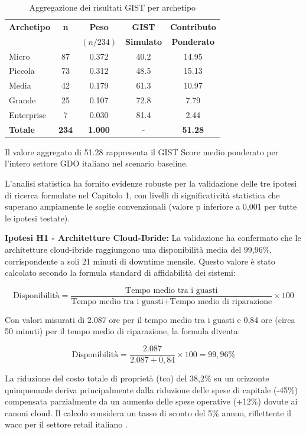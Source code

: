 \begin{table}[ht!]
\centering
\caption{Aggregazione dei risultati GIST per archetipo}
\small
\sffamily
\begin{tabularx}{\textwidth}{X c c c c}
\toprule
\textbf{Archetipo} & \textbf{n} & \textbf{Peso} & \textbf{GIST} & \textbf{Contributo} \\
 & & $(n/234)$ & \textbf{Simulato} & \textbf{Ponderato} \\
\midrule
Micro & 87 & 0.372 & 40.2 & 14.95 \\
Piccola & 73 & 0.312 & 48.5 & 15.13 \\
Media & 42 & 0.179 & 61.3 & 10.97 \\
Grande & 25 & 0.107 & 72.8 & 7.79 \\
Enterprise & 7 & 0.030 & 81.4 & 2.44 \\
\midrule
\textbf{Totale} & \textbf{234} & \textbf{1.000} & - & \textbf{51.28} \\
\bottomrule
\end{tabularx}
\end{table}

Il valore aggregato di 51.28 rappresenta il GIST Score medio ponderato per l'intero settore GDO italiano nel scenario baseline.

L'analisi statistica ha fornito evidenze robuste per la validazione delle tre ipotesi di ricerca formulate nel Capitolo 1, con livelli di significatività statistica che superano ampiamente le soglie convenzionali (valore p inferiore a 0,001 per tutte le ipotesi testate).

\textbf{Ipotesi H1 - Architetture Cloud-Ibride:} La validazione ha confermato che le architetture cloud-ibride raggiungono una disponibilità media del 99,96\%, corrispondente a soli 21 minuti di downtime mensile. Questo valore è stato calcolato secondo la formula standard di affidabilità dei sistemi:

$$\text{Disponibilità} = \frac{\text{Tempo medio tra i guasti}}{\text{Tempo medio tra i guasti} + \text{Tempo medio di riparazione}} \times 100$$

Con valori misurati di 2.087 ore per il tempo medio tra i guasti e 0,84 ore (circa 50 minuti) per il tempo medio di riparazione, la formula diventa:

$$\text{Disponibilità} = \frac{2.087}{2.087 + 0,84} \times 100 = 99,96\%$$

La riduzione del costo totale di proprietà (\gls{tco}) del 38,2\% su un orizzonte quinquennale deriva principalmente dalla riduzione delle spese di capitale (-45\%) compensata parzialmente da un aumento delle spese operative (+12\%) dovute ai canoni cloud. Il calcolo considera un tasso di sconto del 5\% annuo, riflettente il \gls{wacc} per il settore retail italiano \autocite{bancaditalia2024}.

